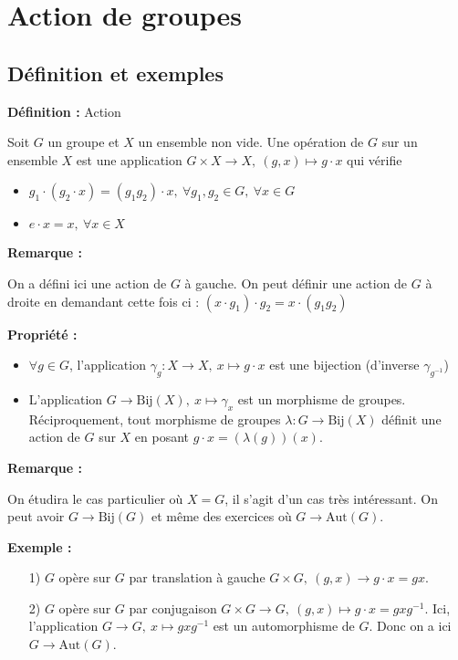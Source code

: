 \documentclass{report}
\newenvironment{definition}[1][]{
    \begin{tcolorbox}[colframe= white]
    \textbf{Définition :} 
    #1 \par
    }
    {\end{tcolorbox}}
\newenvironment{prop}{\begin{tcolorbox}[colframe= white]
    \textbf{Propriété :}
     \par}
    {\end{tcolorbox}}
\newenvironment{exemple}{\begin{tcolorbox}[colback=gray!10,colframe= white]
    \textbf{Exemple :}
     \par}
    {\end{tcolorbox}}
\newcommand{\remarque}{
    \noindent\textbf{Remarque :} \par
}
\begin{document}
\chapter{Action de groupes}


\section{Définition et exemples}
\par
\begin{definition}[Action] Soit $G$ un groupe et $X$ un ensemble non vide. Une opération de $G$ sur un ensemble $X$ est une application $G\times X\longrightarrow  X,\ (g,x)\mapsto  g\cdot x$
qui vérifie
\begin{itemize}
\item $g_1\cdot(g_2\cdot x)=(g_1g_2)\cdot x,\ \forall g_1,g_2\in G,\ \forall x\in G$
\item $e\cdot x=x,\ \forall x\in X$
\end{itemize}
\end{definition}
\par
\remarque{On a défini ici une action de $G$ à gauche. On peut définir une action de $G$ à droite en demandant cette fois ci : $(x\cdot g_1)\cdot g_2=x\cdot (g_1g_2)$}
\par
\begin{prop}
\begin{itemize}
\item $\forall g\in G$, l'application $\gamma_g:X\longrightarrow  X,\ x\mapsto  g\cdot x$ est une bijection (d'inverse $\gamma_{g^{-1}}$)
\item L'application $G\longrightarrow \text{Bij}(X),\ x\mapsto  \gamma_x$ est un morphisme de groupes. Réciproquement, tout morphisme de groupes $\lambda:G\longrightarrow  \text{Bij}(X)$ définit une action de $G$ sur $X$ en posant $g\cdot x=(\lambda(g))(x)$.
\end{itemize}
\end{prop}
\par
\remarque{On étudira le cas particulier où $X=G$, il s'agit d'un cas très intéressant. On peut avoir $G\longrightarrow \text{Bij}(G)$ et même des exercices où $G\longrightarrow \text{Aut}(G)$.}
\par
\begin{exemple}
\begin{itemize}
\item[1)] $G$ opère sur $G$ par translation à gauche $G\times G,\ (g,x)\longrightarrow  g\cdot x=gx$. 
\item[2)] $G$ opère sur $G$ par conjugaison  $G\times G\longrightarrow  G,\ (g,x)\mapsto  g\cdot x=gxg^{-1}$. Ici, l'application $G\longrightarrow  G,\ x\mapsto  gxg^{-1}$ est un automorphisme de $G$. Donc on a ici $G\longrightarrow  \text{Aut}(G)$. 
\end{itemize}
\end{exemple}
\end{document}
